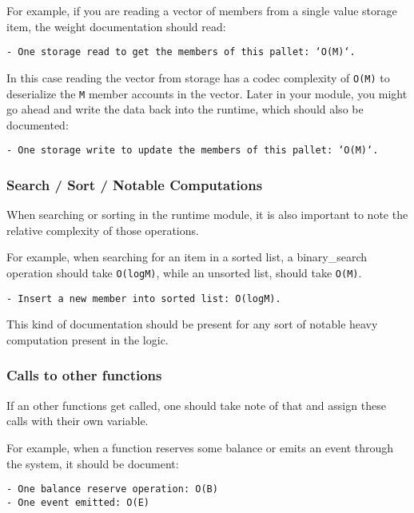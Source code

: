 \documentclass[11pt,a4paper]{article}
\begin{document}
For example, if you are reading a vector of members from a single value storage
item, the weight documentation should read:
\newline

\texttt{- One storage read to get the members of this pallet: `O(M)`.}
\newline

In this case reading the vector from storage has a codec complexity of \texttt{O(M)}
to deserialize the \texttt{M} member accounts in the vector. Later in your module,
you might go ahead and write the data back into the runtime, which should also be
documented:
\newline

\texttt{- One storage write to update the members of this pallet: `O(M)`.}

\subsubsection{Search / Sort / Notable Computations}
When searching or sorting in the runtime module, it is also important to note
the relative complexity of those operations.
\newline

For example, when searching for an item in a sorted list, a binary\_search
operation should take \texttt{O(logM)}, while an unsorted list, should take
\texttt{O(M)}.
\newline

\texttt{- Insert a new member into sorted list: O(logM).}
\newline

This kind of documentation should be present for any sort of notable heavy
computation present in the logic.

\subsubsection{Calls to other functions}

If an other functions get called, one should take note of that and assign these calls
with their own variable.
\newline

For example, when a function reserves some balance or emits an event through the
system, it should be document:

\begin{verbatim}
- One balance reserve operation: O(B)
- One event emitted: O(E)
\end{verbatim}
\end{document}
